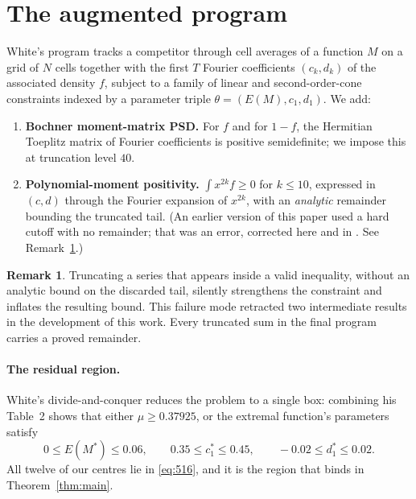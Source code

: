 \documentclass[11pt]{article}
\theoremstyle{definition}
\newtheorem{remark}[theorem]{Remark}
\begin{document}
\section{The augmented program}\label{sec:setup}

White's program tracks a competitor through cell averages of a function
$M$ on a grid of $N$ cells together with the first $T$ Fourier
coefficients $(c_k,d_k)$ of the associated density $f$, subject to a
family of linear and second-order-cone constraints indexed by a
parameter triple $\theta = (E(M), c_1, d_1)$. We add:
\begin{enumerate}
\item \textbf{Bochner moment-matrix PSD.} For $f$ and for $1-f$, the
  Hermitian Toeplitz matrix of Fourier coefficients is positive
  semidefinite; we impose this at truncation level $40$.
\item \textbf{Polynomial-moment positivity.} $\int x^{2k} f \ge 0$ for
  $k \le 10$, expressed in $(c,d)$ through the Fourier expansion of
  $x^{2k}$, with an \emph{analytic} remainder bounding the truncated
  tail. (An earlier version of this paper used a hard cutoff with no
  remainder; that was an error, corrected here and in
  \cite{repo}. See Remark~\ref{rem:tail}.)
\end{enumerate}

\begin{remark}\label{rem:tail}
Truncating a series that appears inside a valid inequality, without an
analytic bound on the discarded tail, silently strengthens the
constraint and inflates the resulting bound. This failure mode retracted
two intermediate results in the development of this work. Every
truncated sum in the final program carries a proved remainder.
\end{remark}

\paragraph{The residual region.} White's divide-and-conquer reduces the
problem to a single box: combining his Table~2 shows that either
$\mu \ge 0.37925$, or the extremal function's parameters satisfy
\begin{equation}\label{eq:516}
  0 \le E(M^*) \le 0.06, \qquad
  0.35 \le c_1^* \le 0.45, \qquad
  -0.02 \le d_1^* \le 0.02 .
\end{equation}
All twelve of our centres lie in \eqref{eq:516}, and it is the region
that binds in Theorem~\ref{thm:main}.
\end{document}
